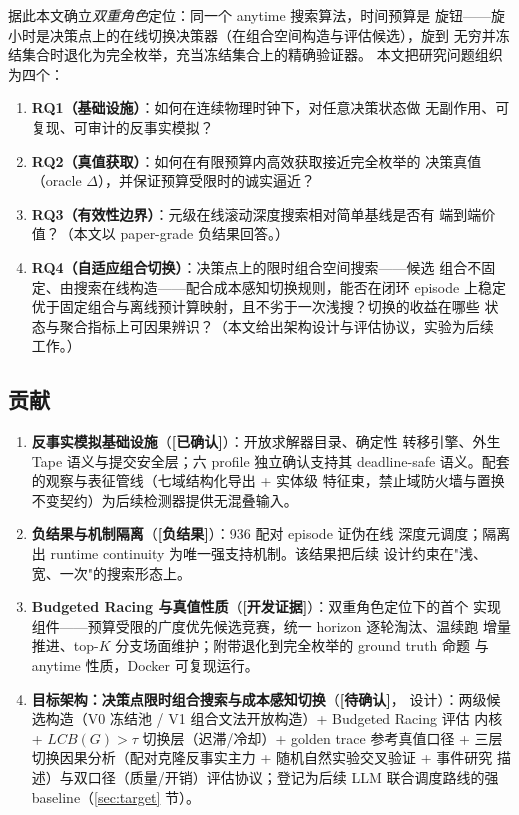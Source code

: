 \documentclass[11pt,a4paper]{article}
\newcommand{\racing}{Budgeted Racing}
\newcommand{\confirmed}{\textcolor{green!45!black}{\textbf{[已确认]}}}
\newcommand{\development}{\textcolor{orange!80!black}{\textbf{[开发证据]}}}
\newcommand{\pending}{\textcolor{red!70!black}{\textbf{[待确认]}}}
\newcommand{\negative}{\textcolor{red!70!black}{\textbf{[负结果]}}}
\begin{document}
据此本文确立\emph{双重角色}定位：同一个 anytime 搜索算法，时间预算是
旋钮——旋小时是决策点上的在线切换决策器（在组合空间构造与评估候选），旋到
无穷并冻结集合时退化为完全枚举，充当冻结集合上的精确验证器。
本文把研究问题组织为四个：

\begin{enumerate}
    \item \textbf{RQ1（基础设施）}：如何在连续物理时钟下，对任意决策状态做
    无副作用、可复现、可审计的反事实模拟？
    \item \textbf{RQ2（真值获取）}：如何在有限预算内高效获取接近完全枚举的
    决策真值（oracle $\Delta$），并保证预算受限时的诚实逼近？
    \item \textbf{RQ3（有效性边界）}：元级在线滚动深度搜索相对简单基线是否有
    端到端价值？（本文以 paper-grade 负结果回答。）
    \item \textbf{RQ4（自适应组合切换）}：决策点上的限时组合空间搜索——候选
    组合不固定、由搜索在线构造——配合成本感知切换规则，能否在闭环 episode
    上稳定优于固定组合与离线预计算映射，且不劣于一次浅搜？切换的收益在哪些
    状态与聚合指标上可因果辨识？（本文给出架构设计与评估协议，实验为后续
    工作。）
\end{enumerate}

\subsection{贡献}

\begin{enumerate}
    \item \textbf{反事实模拟基础设施}（\confirmed）：开放求解器目录、确定性
    转移引擎、外生 Tape 语义与提交安全层；六 profile 独立确认支持其
    deadline-safe 语义。配套的观察与表征管线（七域结构化导出 + 实体级
    特征束，禁止域防火墙与置换不变契约）为后续检测器提供无混叠输入。
    \item \textbf{负结果与机制隔离}（\negative）：936 配对 episode 证伪在线
    深度元调度；隔离出 runtime continuity 为唯一强支持机制。该结果把后续
    设计约束在"浅、宽、一次"的搜索形态上。
    \item \textbf{\racing{} 与真值性质}（\development）：双重角色定位下的首个
    实现组件——预算受限的广度优先候选竞赛，统一 horizon 逐轮淘汰、温续跑
    增量推进、top-$K$ 分支场面维护；附带退化到完全枚举的 ground truth 命题
    与 anytime 性质，Docker 可复现运行。
    \item \textbf{目标架构：决策点限时组合搜索与成本感知切换}（\pending，
    设计）：两级候选构造（V0 冻结池 / V1 组合文法开放构造）+ \racing{} 评估
    内核 + $LCB(G)>\tau$ 切换层（迟滞/冷却）+ golden trace 参考真值口径 +
    三层切换因果分析（配对克隆反事实主力 + 随机自然实验交叉验证 + 事件研究
    描述）与双口径（质量/开销）评估协议；登记为后续 LLM 联合调度路线的强
    baseline（\ref{sec:target} 节）。
\end{enumerate}
\end{document}
